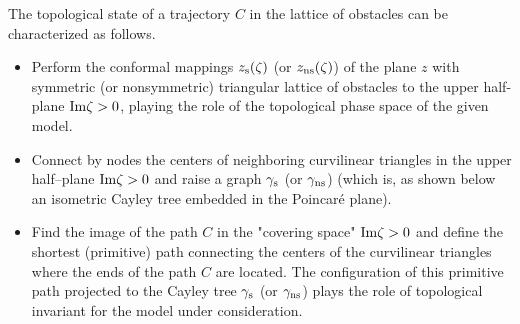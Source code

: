 The topological state of a trajectory $C$ in the lattice of obstacles can
be characterized as follows. 
\begin{itemize}
\item Perform the conformal mappings $z_{\rm s}(\zeta)$ (or $z_{\rm ns}(\zeta)$) of
the plane $z$ with symmetric (or nonsymmetric) triangular lattice of obstacles
to the upper half-plane ${\rm Im}\zeta>0$,  playing the role of the topological phase
space of the  given model. 
\item Connect by nodes the centers of neighboring curvilinear triangles in the
upper half--plane ${\rm Im}\zeta>0$ and raise a graph  $\gamma_{\rm s}$ (or 
$\gamma_{\rm ns}$) (which is, as shown below an isometric Cayley tree  embedded in the Poincar\'e plane).
\item Find the image of the path $C$ in the "covering space" ${\rm Im}\zeta>0$
and define the shortest (primitive) path connecting the  centers of the
curvilinear triangles where the ends of the path $C$ are located. The
configuration of this primitive path projected to  the Cayley tree 
$\gamma_{\rm s}$ (or $\gamma_{\rm ns}$) plays the  role of topological invariant 
for the model under consideration. 
\end{itemize} 

